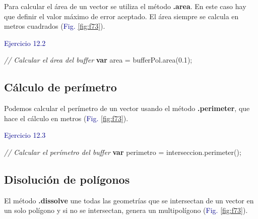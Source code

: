 \documentclass[
  12pt,
  letterpaper,
  twoside]{book}
\newenvironment{Shaded}{\begin{snugshade}}{\end{snugshade}}
\newcommand{\CommentTok}[1]{\textcolor[rgb]{0.24,0.58,0.00}{\textit{#1}}}
\newcommand{\ControlFlowTok}[1]{\textcolor[rgb]{0.00,0.00,0.00}{\textbf{#1}}}
\newcommand{\FloatTok}[1]{\textcolor[rgb]{0.28,0.53,0.93}{#1}}
\newcommand{\FunctionTok}[1]{\textcolor[rgb]{0.48,0.12,0.64}{#1}}
\newcommand{\NormalTok}[1]{#1}
\newcommand{\OperatorTok}[1]{\textcolor[rgb]{0.00,0.00,0.00}{#1}}
\newcommand\boldpurple[1]{\textcolor{darkpurple}{\textbf{#1}}}
\begin{document}
Para calcular el área de un vector se utiliza el método \boldpurple{.area}. En este caso hay que definir el valor máximo de error aceptado. El área siempre se calcula en metros cuadrados (\textcolor{darkblue}{Fig.} \ref{fig:f73}).

\textcolor{darkblue}{Ejercicio 12.2}

\begin{Shaded}
\begin{Highlighting}[]
\CommentTok{// Calcular el área del buffer}
\ControlFlowTok{var}\NormalTok{ area }\OperatorTok{=}\NormalTok{ bufferPol}\OperatorTok{.}\FunctionTok{area}\NormalTok{(}\FloatTok{0.1}\NormalTok{)}\OperatorTok{;}
\end{Highlighting}
\end{Shaded}

\hypertarget{cuxe1lculo-de-peruxedmetro}{%
\subsection*{Cálculo de perímetro}\label{cuxe1lculo-de-peruxedmetro}}

Podemos calcular el perímetro de un vector usando el método \boldpurple{.perimeter}, que hace el cálculo en metros (\textcolor{darkblue}{Fig.} \ref{fig:f73}).

\textcolor{darkblue}{Ejercicio 12.3}

\begin{Shaded}
\begin{Highlighting}[]
\CommentTok{// Calcular el perímetro del buffer}
\ControlFlowTok{var}\NormalTok{ perimetro }\OperatorTok{=}\NormalTok{ interseccion}\OperatorTok{.}\FunctionTok{perimeter}\NormalTok{()}\OperatorTok{;}
\end{Highlighting}
\end{Shaded}

\hypertarget{disoluciuxf3n-de-poluxedgonos}{%
\subsection*{Disolución de polígonos}\label{disoluciuxf3n-de-poluxedgonos}}

El método \boldpurple{.dissolve} une todas las geometrías que se intersectan de un vector en un solo polígono y si no se intersectan, genera un multipolígono (\textcolor{darkblue}{Fig.} \ref{fig:f73}).
\end{document}
